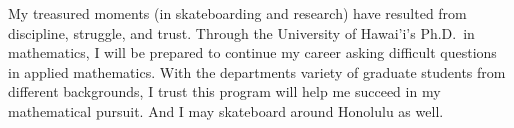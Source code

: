 \documentclass[11pt]{article}
\begin{document}
My treasured moments (in skateboarding and research) have resulted from discipline, struggle, and trust. Through the University of Hawai'i's Ph.D.\ in mathematics, I will be prepared to continue my career asking difficult questions in applied mathematics. With the departments variety of graduate students from different backgrounds, I trust this program will help me succeed in my mathematical pursuit. And I may skateboard around Honolulu as well.
\end{document}
